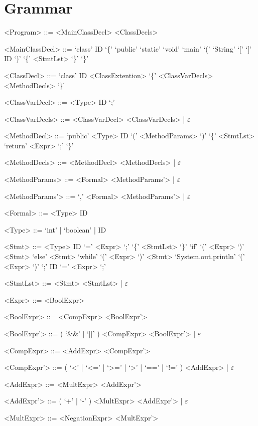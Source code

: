 \documentclass{report}
\begin{document}
\setlength{\grammarparsep}{4pt} %
\setlength{\grammarindent}{12em} %

\section*{Grammar}
\begin{grammar}

<Program> ::= <MainClassDecl> <ClassDecls>

<MainClassDecl> ::= `class' ID `\{' `public' `static' `void' `main' `(' `String' `[' `]' ID `)' `\{' <StmtLst> `\}' `\}'

<ClassDecl> ::= `class' ID <ClassExtention> `\{' <ClassVarDecls> <MethodDecls> `\}'

<ClassVarDecl> ::= <Type> ID `;'

<ClassVarDecls> ::= <ClassVarDecl> <ClassVarDecls> | $\varepsilon$

<MethodDecl> ::= `public' <Type> ID `(' <MethodParams> `)' `\{' <StmtLst> `return' <Expr> `;' `\}'

<MethodDecls> ::= <MethodDecl> <MethodDecls> | $\varepsilon$

<MethodParams> ::= <Formal> <MethodParams'> | $\varepsilon$

<MethodParams'> ::= `,' <Formal> <MethodParams'> | $\varepsilon$

<Formal> ::= <Type> ID

<Type> ::= `int' | `boolean' | ID

<Stmt> ::= <Type> ID `=' <Expr> `;'
\alt `\{' <StmtLst> `\}'
\alt `if' `(' <Expr> `)' <Stmt> `else' <Stmt>
\alt `while' `(' <Expr> `)' <Stmt>
\alt `System.out.println' `(' <Expr> `)' `;'
\alt ID `=' <Expr> `;'

<StmtLst> ::= <Stmt> <StmtLst> | $\varepsilon$

<Expr> ::= <BoolExpr>

<BoolExpr> ::= <CompExpr> <BoolExpr'>

<BoolExpr'> ::= ( `&&' | `||' ) <CompExpr> <BoolExpr'> | $\varepsilon$

<CompExpr> ::= <AddExpr> <CompExpr'>

<CompExpr'> ::= ( `<' | `<=' | `>=' | `>' | `==' | `!=' ) <AddExpr> | $\varepsilon$

<AddExpr> ::= <MultExpr> <AddExpr'>

<AddExpr'> ::= ( `+' | `-' ) <MultExpr> <AddExpr'> | $\varepsilon$

<MultExpr> ::= <NegationExpr> <MultExpr'>


\end{grammar}
\end{document}

